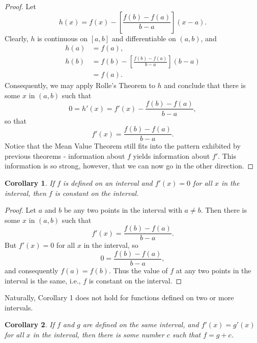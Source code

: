 \documentclass{article}
\newtheorem{corollary}{Corollary}
\begin{document}
\begin{proof}
  Let \begin{equation*}
    h(x) = f(x) - \left[\frac{f(b) - f(a)}{b - a}\right](x - a).
  \end{equation*} Clearly, $h$ is continuous on $[a, b]$ and differentiable on
  $(a, b)$, and \begin{align*}
    h(a) &= f(a), \\
    h(b) &= f(b) - \left[\frac{f(b) - f(a)}{b - a}\right](b - a) \\
      &= f(a).
  \end{align*} Consequently, we may apply Rolle's Theorem to $h$ and conclude
  that there is some $x$ in $(a, b)$ such that \begin{equation*}
    0 = h'(x) = f'(x) - \frac{f(b) - f(a)}{b - a},
  \end{equation*} so that \begin{equation*}
    f'(x) = \frac{f(b) - f(a)}{b - a}.
  \end{equation*} Notice that the Mean Value Theorem still fits into the
  pattern exhibited by previous theorems - information about $f$ yields
  information about $f'$. This information is so strong, however, that we can
  now go in the other direction.
\end{proof}

\begin{corollary}
  If $f$ is defined on an interval and $f'(x) = 0$ for all $x$ in the interval,
  then $f$ is constant on the interval.
\end{corollary}

\begin{proof}
  Let $a$ and $b$ be any two points in the interval with $a \neq b$. Then there
  is some $x$ in $(a, b)$ such that \begin{equation*}
    f'(x) = \frac{f(b) - f(a)}{b - a}.
  \end{equation*} But $f'(x) = 0$ for all $x$ in the interval, so
  \begin{equation*}
    0 = \frac{f(b) - f(a)}{b - a},
  \end{equation*} and consequently $f(a) = f(b)$. Thus the value of $f$ at any
  two points in the interval is the same, i.e., $f$ is constant on the
  interval.
\end{proof}

Naturally, Corollary 1 does not hold for functions defined on two or more
intervals.

\begin{corollary}
  If $f$ and $g$ are defined on the same interval, and $f'(x) = g'(x)$ for all
  $x$ in the interval, then there is some number $c$ such that $f = g + c$.
\end{corollary}
\end{document}
